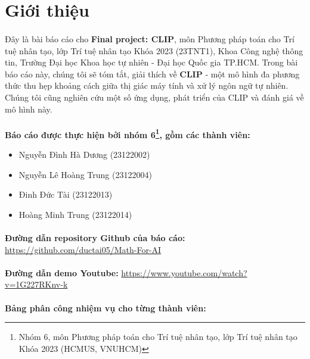 \newpage
\section{Giới thiệu}

\paragraph{}{Đây là bài báo cáo cho \textbf{Final project: CLIP}, môn Phương pháp toán cho Trí tuệ nhân tạo, lớp Trí tuệ nhân tạo Khóa 2023 (23TNT1), Khoa Công nghệ thông tin, Trường Đại học Khoa học tự nhiên - Đại học Quốc gia TP.HCM. Trong bài báo cáo này, chúng tôi sẽ tóm tắt, giải thích về \textbf{CLIP} - một mô hình đa phương thức thu hẹp khoảng cách giữa thị giác máy tính và xử lý ngôn ngữ tự nhiên. Chúng tôi cũng nghiên cứu một số ứng dụng, phát triển của CLIP và đánh giá về mô hình này.}

\paragraph{}{\textbf{Báo cáo được thực hiện bởi nhóm 6\footnote{Nhóm 6, môn Phương pháp toán cho Trí tuệ nhân tạo, lớp Trí tuệ nhân tạo Khóa 2023 (HCMUS, VNUHCM)}, gồm các thành viên:}} 
\begin{itemize}
    \item Nguyễn Đình Hà Dương (23122002)
    \item Nguyễn Lê Hoàng Trung (23122004)
    \item Đinh Đức Tài (23122013)
    \item Hoàng Minh Trung (23122014)
\end{itemize}

\paragraph{}{\textbf{Đường dẫn repository Github của báo cáo:} \href{https://github.com/ductai05/Math-For-AI}{https://github.com/ductai05/Math-For-AI} \cite{repo}}

\paragraph{}{\textbf{Đường dẫn demo Youtube:}} \href{https://www.youtube.com/watch?v=1G227RKnv-k}{https://www.youtube.com/watch?v=1G227RKnv-k} \cite{demo}

\paragraph{}{\textbf{Bảng phân công nhiệm vụ cho từng thành viên:}}


